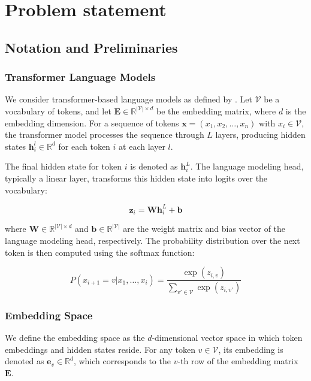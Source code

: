 \chapter{Problem statement}

\section{Notation and Preliminaries}

\subsection{Transformer Language Models}

We consider transformer-based language models as defined by \cite{vaswani2017attention}. Let $\mathcal{V}$ be a vocabulary of tokens, and let $\mathbf{E} \in \mathbb{R}^{|\mathcal{V}| \times d}$ be the embedding matrix, where $d$ is the embedding dimension. For a sequence of tokens $\mathbf{x} = (x_1, x_2, \ldots, x_n)$ with $x_i \in \mathcal{V}$, the transformer model processes the sequence through $L$ layers, producing hidden states $\mathbf{h}_i^l \in \mathbb{R}^d$ for each token $i$ at each layer $l$.

The final hidden state for token $i$ is denoted as $\mathbf{h}_i^L$. The language modeling head, typically a linear layer, transforms this hidden state into logits over the vocabulary:

\begin{equation}
    \mathbf{z}_i = \mathbf{W} \mathbf{h}_i^L + \mathbf{b}
    \label{eq::lm_head}
\end{equation}

where $\mathbf{W} \in \mathbb{R}^{|\mathcal{V}| \times d}$ and $\mathbf{b} \in \mathbb{R}^{|\mathcal{V}|}$ are the weight matrix and bias vector of the language modeling head, respectively. The probability distribution over the next token is then computed using the softmax function:

\begin{equation}
    P(x_{i+1} = v | x_1, \ldots, x_i) = \frac{\exp(z_{i,v})}{\sum_{v' \in \mathcal{V}} \exp(z_{i,v'})}
    \label{eq::softmax}
\end{equation}

\subsection{Embedding Space}

We define the embedding space as the $d$-dimensional vector space in which token embeddings and hidden states reside. For any token $v \in \mathcal{V}$, its embedding is denoted as $\mathbf{e}_v \in \mathbb{R}^d$, which corresponds to the $v$-th row of the embedding matrix $\mathbf{E}$.

